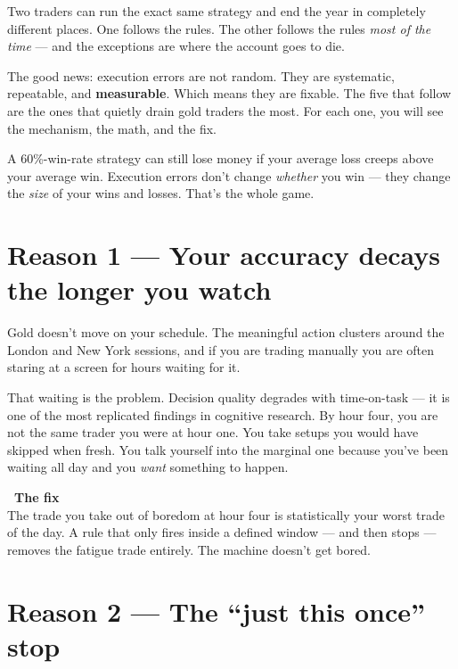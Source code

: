 \documentclass[11pt]{article}
\newcommand{\fixlabel}{{\color{neon}\bfseries\faArrowRight\ The fix }}
\begin{document}
Two traders can run the exact same strategy and end the year in completely different places. One follows the rules. The other follows the rules \emph{most of the time} --- and the exceptions are where the account goes to die.

The good news: execution errors are not random. They are systematic, repeatable, and \textbf{measurable}. Which means they are fixable. The five that follow are the ones that quietly drain gold traders the most. For each one, you will see the mechanism, the math, and the fix.

\vspace{1ex}
\begin{leakbox}
A 60\%-win-rate strategy can still lose money if your average loss creeps above your average win. Execution errors don't change \emph{whether} you win --- they change the \emph{size} of your wins and losses. That's the whole game.
\end{leakbox}

\newpage

\section{Reason 1 --- Your accuracy decays the longer you watch}

Gold doesn't move on your schedule. The meaningful action clusters around the London and New York sessions, and if you are trading manually you are often staring at a screen for hours waiting for it.

That waiting is the problem. Decision quality degrades with time-on-task --- it is one of the most replicated findings in cognitive research. By hour four, you are not the same trader you were at hour one. You take setups you would have skipped when fresh. You talk yourself into the marginal one because you've been waiting all day and you \emph{want} something to happen.

\begin{fixbox}
\fixlabel\\[0.4ex]
The trade you take out of boredom at hour four is statistically your worst trade of the day. A rule that only fires inside a defined window --- and then stops --- removes the fatigue trade entirely. The machine doesn't get bored.
\end{fixbox}

\section{Reason 2 --- The ``just this once'' stop}
\end{document}
